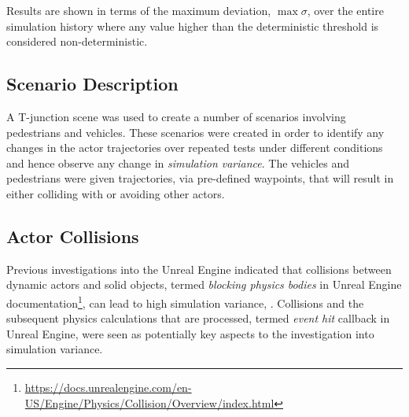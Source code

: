 \documentclass[letterpaper, 10 pt, journal, twoside]{IEEEtran}
\begin{document}
Results are shown in terms of the maximum deviation, $\max\sigma$, over the entire simulation history %
where any value higher than the deterministic threshold is considered non-deterministic. 




\subsection{Scenario Description}\label{TestsDescriptionAndTechnicalities}
A T-junction scene was used to create a number of scenarios involving pedestrians and vehicles. 
%
These scenarios were created in order to identify any changes in the actor trajectories over repeated tests under different conditions and hence observe any change in \textit{simulation variance}.
%
The vehicles and pedestrians were given trajectories, via pre-defined waypoints, that will result in either colliding with or avoiding other actors. 

\subsection{Actor Collisions}\label{S:Actor_Collisions}
Previous investigations into the Unreal Engine indicated that collisions between dynamic actors and solid objects, termed \textit{blocking physics bodies} in Unreal Engine documentation\footnote{\url{https://docs.unrealengine.com/en-US/Engine/Physics/Collision/Overview/index.html}}, can lead to high simulation variance, \cite{TSLUnrealEngineTesting}. 
%
Collisions and the subsequent physics calculations that are processed, termed \textit{event hit} callback in Unreal Engine, were seen as potentially key aspects to the investigation into simulation variance.
\end{document}
